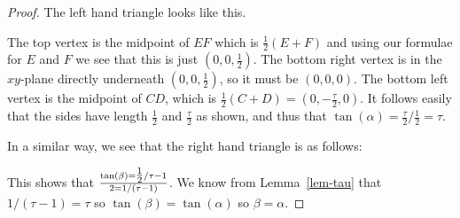 \documentclass{amsart}
\newcommand{\half}      {{\textstyle\frac{1}{2}}}
\newcommand{\thf}       {{\textstyle\frac{\tau}{2}}}
\newcommand{\al}        {\alpha}
\newcommand{\bt}        {\beta}
\renewcommand{\:}{\colon}
\theoremstyle{definition}
\begin{document}
\begin{proof}
 The left hand triangle looks like this.
 \begin{center}
 \end{center}
 The top vertex is the midpoint of $EF$ which is $\half(E+F)$ and
 using our formulae for $E$ and $F$ we see that this is just
 $(0,0,\half)$.  The bottom right vertex is in the $xy$-plane directly
 underneath $(0,0,\half)$, so it must be $(0,0,0)$.  The bottom left
 vertex is the midpoint of $CD$, which is $\half(C+D)=(0,-\thf,0)$.
 It follows easily that the sides have length $\half$ and $\thf$ as
 shown, and thus that $\tan(\al)=\thf/\half=\tau$.

 In a similar way, we see that the right hand triangle is as follows:
 \begin{center}
 \end{center}
 This shows that $\tan(\bt)=\half/{\tau-1}\over{2}=1/(\tau-1)$.  We
 know from Lemma~\ref{lem-tau} that $1/(\tau-1)=\tau$ so
 $\tan(\bt)=\tan(\al)$ so $\bt=\al$.
\end{proof}
\end{document}
